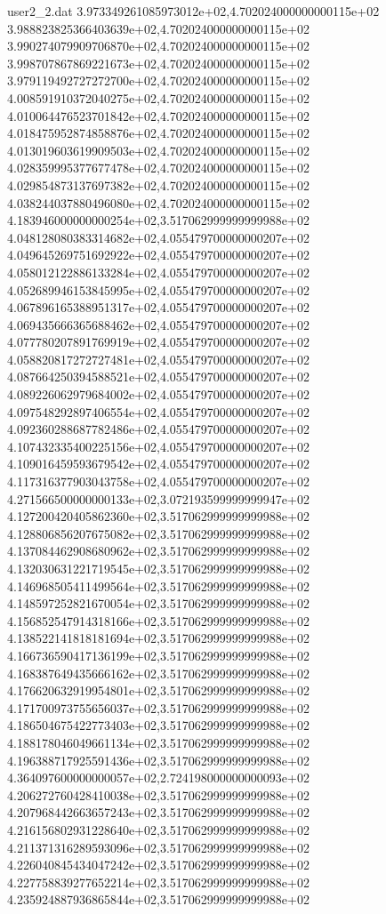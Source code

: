 \begin{filecontents}{user2_2.dat}
3.973349261085973012e+02,4.702024000000000115e+02
3.988823825366403639e+02,4.702024000000000115e+02
3.990274079909706870e+02,4.702024000000000115e+02
3.998707867869221673e+02,4.702024000000000115e+02
3.979119492727272700e+02,4.702024000000000115e+02
4.008591910372040275e+02,4.702024000000000115e+02
4.010064476523701842e+02,4.702024000000000115e+02
4.018475952874858876e+02,4.702024000000000115e+02
4.013019603619909503e+02,4.702024000000000115e+02
4.028359995377677478e+02,4.702024000000000115e+02
4.029854873137697382e+02,4.702024000000000115e+02
4.038244037880496080e+02,4.702024000000000115e+02
4.183946000000000254e+02,3.517062999999999988e+02
4.048128080383314682e+02,4.055479700000000207e+02
4.049645269751692922e+02,4.055479700000000207e+02
4.058012122886133284e+02,4.055479700000000207e+02
4.052689946153845995e+02,4.055479700000000207e+02
4.067896165388951317e+02,4.055479700000000207e+02
4.069435666365688462e+02,4.055479700000000207e+02
4.077780207891769919e+02,4.055479700000000207e+02
4.058820817272727481e+02,4.055479700000000207e+02
4.087664250394588521e+02,4.055479700000000207e+02
4.089226062979684002e+02,4.055479700000000207e+02
4.097548292897406554e+02,4.055479700000000207e+02
4.092360288687782486e+02,4.055479700000000207e+02
4.107432335400225156e+02,4.055479700000000207e+02
4.109016459593679542e+02,4.055479700000000207e+02
4.117316377903043758e+02,4.055479700000000207e+02
4.271566500000000133e+02,3.072193599999999947e+02
4.127200420405862360e+02,3.517062999999999988e+02
4.128806856207675082e+02,3.517062999999999988e+02
4.137084462908680962e+02,3.517062999999999988e+02
4.132030631221719545e+02,3.517062999999999988e+02
4.146968505411499564e+02,3.517062999999999988e+02
4.148597252821670054e+02,3.517062999999999988e+02
4.156852547914318166e+02,3.517062999999999988e+02
4.138522141818181694e+02,3.517062999999999988e+02
4.166736590417136199e+02,3.517062999999999988e+02
4.168387649435666162e+02,3.517062999999999988e+02
4.176620632919954801e+02,3.517062999999999988e+02
4.171700973755656037e+02,3.517062999999999988e+02
4.186504675422773403e+02,3.517062999999999988e+02
4.188178046049661134e+02,3.517062999999999988e+02
4.196388717925591436e+02,3.517062999999999988e+02
4.364097600000000057e+02,2.724198000000000093e+02
4.206272760428410038e+02,3.517062999999999988e+02
4.207968442663657243e+02,3.517062999999999988e+02
4.216156802931228640e+02,3.517062999999999988e+02
4.211371316289593096e+02,3.517062999999999988e+02
4.226040845434047242e+02,3.517062999999999988e+02
4.227758839277652214e+02,3.517062999999999988e+02
4.235924887936865844e+02,3.517062999999999988e+02

\end{filecontents}
